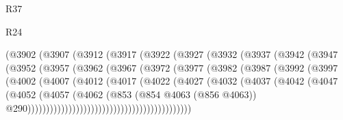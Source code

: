 \begin{lexlean}{R37}
\begin{lexlean}{R24}
\begin{coremodule}
{{{{{{{{{{{{{{{{{{{{{{{{{{{{{{{{{{{{{{{{{{{{{{{{{{{{{{{{{{{{{{{{{{{{{{{{{{{{{{{{{{{{{{{{{{{{{{{{{{{{{{{{{{{{{{{{{{{{{{{{{{{{{{{{{{{{{{{{{{{{{{{{{{{{{{{{{{{{{{{{{{{{{{{{{{{{{{{{{{{{{{{{{                        (@3902
                          (@3907
                            (@3912
                              (@3917
                                (@3922
                                  (@3927
                                    (@3932
                                      (@3937
                                        (@3942
                                          (@3947
                                            (@3952
                                              (@3957
                                                (@3962
                                                  (@3967
                                                    (@3972
                                                      (@3977
                                                        (@3982
                                                          (@3987
                                                            (@3992
                                                              (@3997
                                                                (@4002
                                                                  (@4007
                                                                    (@4012
                                                                      (@4017
                                                                        (@4022
                                                                          (@4027
                                                                            (@4032
                                                                              (@4037
                                                                                (@4042
                                                                                  (@4047
                                                                                    (@4052
                                                                                      (@4057
                                                                                        (@4062
                                                                                          (@853
                                                                                            (@854
                                                                                              @4063
                                                                                              (@856
                                                                                                @4063))
                                                                                            @290))))))))))))))))))))))))))))))))))))))))))))
}}}}}}}}}}}}}}}}}}}}}}}}}}}}}}}}}}}}}}}}}}}}}}}}}}}}}}}}}}}}}}}}}}}}}}}}}}}}}}}}}}}}}}}}}}}}}}}}}}}}}}}}}}}}}}}}}}}}}}}}}}}}}}}}}}}}}}}}}}}}}}}}}}}}}}}}}}}}}}}}}}}}}}}}}}}}}}}}}}}}}}}}}
\end{coremodule}
\end{lexlean}
\end{lexlean}
